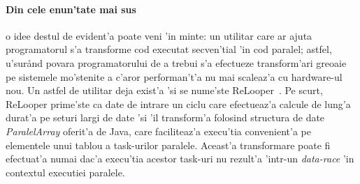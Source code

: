 \paragraph{Din cele enun'tate mai sus} o idee destul de evident'a poate veni
'in minte: un utilitar care ar ajuta programatorul s'a transforme cod executat
secven'tial 'in cod paralel; astfel, u'sur\aa nd povara programatorului de a
trebui s'a efectueze transform'ari greoaie pe sistemele mo'stenite a c'aror
performan't'a nu mai scaleaz'a cu hardware-ul nou. Un astfel de utilitar deja
exist'a 'si se nume'ste ReLooper~\cite{ReLooper}. Pe scurt, ReLooper prime'ste
ca date de intrare un ciclu care efectueaz'a calcule de lung'a durat'a pe seturi
largi de date 'si 'il transform'a folosind structura de date \emph{ParalelArray}
oferit'a de Java, care faciliteaz'a execu'tia convenient'a pe elementele unui
tablou a task-urilor paralele. Aceast'a transformare poate fi efectuat'a numai
dac'a execu'tia acestor task-uri nu rezult'a 'intr-un \emph{data-race} 'in contextul
executiei paralele.

